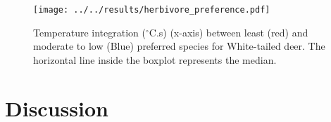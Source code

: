 \documentclass{ttuthes2007}
\begin{document}



\begin{figure}[ht]
     \centering
     \texttt{[image: ../../results/herbivore\_preference.pdf]}
     \caption{Temperature integration ($^{\circ}$C.s) (x-axis) between least (red) and moderate to low (Blue) preferred species for White-tailed deer. The horizontal line inside the boxplot represents the median.}
     \label{fig:herbivore_pref}   
 \end{figure}


\section{Discussion}
\end{document}
